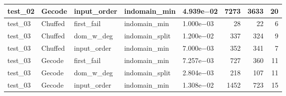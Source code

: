 \begin{compactfloats}
\begin{table}[H]
\begin{tabular}{l l l l l r r r}
    test\_02 & Gecode  & input\_order & indomain\_min   & 4.939e$-$02 & 7273 & 3633 & 20 \\
    \midrule
    test\_03 & Chuffed & first\_fail  & indomain\_min   & 1.000e$-$03 & 28   & 22   & 6 \\
    test\_03 & Chuffed & dom\_w\_deg  & indomain\_split & 1.200e$-$02 & 337  & 324  & 9 \\
    test\_03 & Chuffed & input\_order & indomain\_min   & 7.000e$-$03 & 352  & 341  & 7 \\
    test\_03 & Gecode  & first\_fail  & indomain\_min   & 7.257e$-$03 & 727  & 360  & 11 \\
    test\_03 & Gecode  & dom\_w\_deg  & indomain\_split & 2.804e$-$03 & 218  & 107  & 11 \\
    test\_03 & Gecode  & input\_order & indomain\_min   & 1.308e$-$02 & 1452 & 723  & 15 \\
    \bottomrule
  \end{tabular}
\end{table}


\end{compactfloats}
